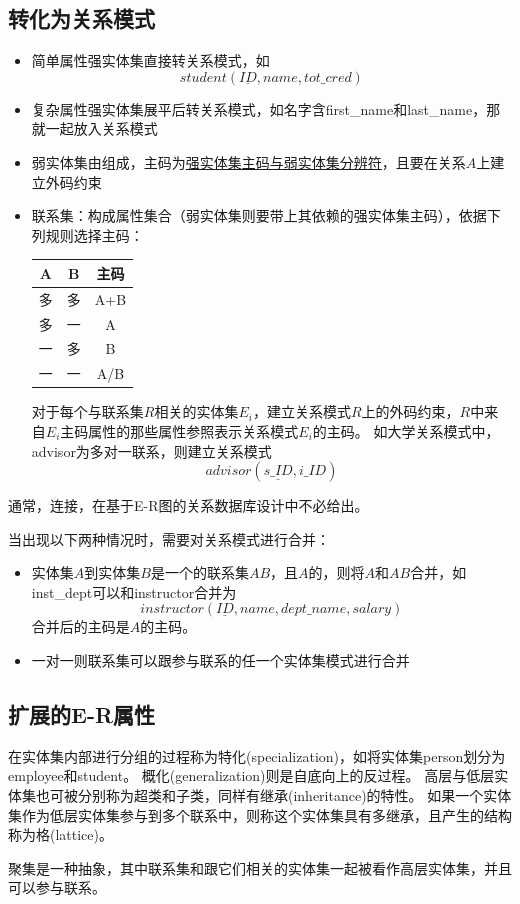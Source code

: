 \subsection{转化为关系模式}
\begin{itemize}
	\item 简单属性强实体集直接转关系模式，如
	\[student(\underline{ID},name,tot\_cred)\]
	\item 复杂属性强实体集展平后转关系模式，如名字含first\_name和last\_name，那就一起放入关系模式
	\item 弱实体集由组成，主码为\underline{强实体集主码与弱实体集分辨符}，且要在关系$A$上建立外码约束
	\item 联系集：构成属性集合（弱实体集则要带上其依赖的强实体集主码），依据下列规则选择主码：
	\begin{center}
	\begin{tabular}{|c|c|c|}\hline
		A & B & 主码\\\hline
		多 & 多 & A+B\\\hline
		多 & 一 & A\\\hline
		一 & 多 & B\\\hline
		一 & 一 & A/B\\\hline
	\end{tabular}
	\end{center}
	对于每个与联系集$R$相关的实体集$E_i$，建立关系模式$R$上的外码约束，$R$中来自$E_i$主码属性的那些属性参照表示关系模式$E_i$的主码。
	如大学关系模式中，advisor为多对一联系，则建立关系模式
	\[advisor(\underline{s\_ID},i\_ID)\]
\end{itemize}

通常，连接，在基于E-R图的关系数据库设计中不必给出。

当出现以下两种情况时，需要对关系模式进行合并：
\begin{itemize}
	\item 实体集$A$到实体集$B$是一个的联系集$AB$，且$A$的，则将$A$和$AB$合并，如inst\_dept可以和instructor合并为
	\[instructor(\underline{ID},name,dept\_name,salary)\]
	合并后的主码是$A$的主码。
	\item 一对一则联系集可以跟参与联系的任一个实体集模式进行合并
\end{itemize}

\subsection{扩展的E-R属性}
\begin{definition}[特化和泛化]
在实体集内部进行分组的过程称为特化(specialization)，如将实体集person划分为employee和student。
概化(generalization)则是自底向上的反过程。
高层与低层实体集也可被分别称为超类和子类，同样有继承(inheritance)的特性。
如果一个实体集作为低层实体集参与到多个联系中，则称这个实体集具有多继承，且产生的结构称为格(lattice)。
\end{definition}

\begin{definition}[聚集]
聚集是一种抽象，其中联系集和跟它们相关的实体集一起被看作高层实体集，并且可以参与联系。
\end{definition}
